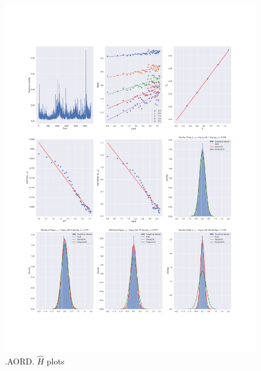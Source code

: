 	\begin{figure}[h]
		\centering
		\includegraphics[width=\linewidth]{fig/.AORD.pdf}
		\caption{.AORD. $\hat{H}$ plots}
	\end{figure}

